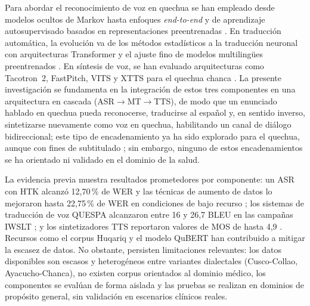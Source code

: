 Para abordar el reconocimiento de voz en quechua se han empleado desde modelos
ocultos de Markov \parencite{Zevallos202061} hasta enfoques \textit{end-to-end}
y de aprendizaje autosupervisado basados en representaciones preentrenadas
\parencite{Chen20246444}. En traducción automática, la evolución va de los
métodos estadísticos a la traducción neuronal con arquitecturas Transformer y el
ajuste fino de modelos multilingües preentrenados
\parencite{Ahmed2023156,Barbaran2026464,Dhawan2026119}. En síntesis de voz, se
han evaluado arquitecturas como Tacotron~2, FastPitch, VITS y XTTS para el
quechua chanca \parencite{HuamanCuro2026}. La presente investigación se
fundamenta en la integración de estos tres componentes en una arquitectura en
cascada (ASR${\rightarrow}$MT${\rightarrow}$TTS), de modo que un enunciado
hablado en quechua pueda reconocerse, traducirse al español y, en sentido
inverso, sintetizarse nuevamente como voz en quechua, habilitando un canal de
diálogo bidireccional; este tipo de encadenamiento ya ha sido explorado para el
quechua, aunque con fines de subtitulado
\parencite{Alvarez-Crespo2023837}; sin embargo, ninguno de estos encadenamientos
se ha orientado ni validado en el dominio de la salud.

La evidencia previa muestra resultados
prometedores por componente: un ASR con HTK alcanzó 12,70\,\% de WER
\parencite{Zevallos202061} y las técnicas de aumento de datos lo mejoraron hasta
22,75\,\% de WER en condiciones de bajo recurso \parencite{Zevallos20223518};
los sistemas de traducción de voz QUESPA alcanzaron entre 16 y 26,7 BLEU en las
campañas IWSLT \parencite{Ortega2023261,Ortega2024173,Ortega2025260}; y los
sintetizadores TTS reportaron valores de MOS de hasta 4,9
\parencite{HuamanCuro2026}. Recursos como el corpus Huqariq
\parencite{zevallos2022huqariq} y el modelo QuBERT \parencite{Zevallos20221} han
contribuido a mitigar la escasez de datos. No obstante, persisten limitaciones
relevantes: los datos disponibles son escasos y heterogéneos entre variantes
dialectales (Cusco-Collao, Ayacucho-Chanca), no existen corpus orientados al
dominio médico, los componentes se evalúan de forma aislada y las pruebas se
realizan en dominios de propósito general, sin validación en escenarios clínicos
reales.

